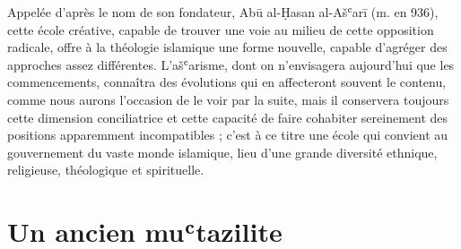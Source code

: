 Appelée d'après le nom de son fondateur, Abū al-Ḥasan al-Ašʿarī
(m. en 936), cette école créative, capable de trouver une voie au milieu
de cette opposition radicale, offre à la théologie islamique une forme
nouvelle, capable d'agréger des approches assez différentes.
L'ašʿarisme, dont on n'envisagera aujourd'hui que les commencements,
connaîtra des évolutions qui en affecteront souvent le contenu, comme
nous aurons l'occasion de le voir par la suite, mais il conservera
toujours cette dimension conciliatrice et cette capacité de faire
cohabiter sereinement des positions apparemment incompatibles ; c'est à
ce titre une école qui convient au gouvernement du vaste monde
islamique, lieu d'une grande diversité ethnique, religieuse, théologique
et spirituelle.



\hypertarget{un-ancien-muux2bftazilite}{%
\section{Un ancien muʿtazilite}\label{un-ancien-muux2bftazilite}}

